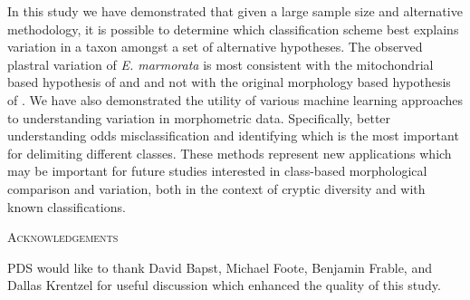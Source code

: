 \documentclass[12pt,letterpaper]{article}\usepackage{graphicx, color}
\renewcommand{\section}[1]{%
\bigskip
\begin{center}
\begin{Large}
\normalfont\scshape #1
\medskip
\end{Large}
\end{center}}
\begin{document}

In this study we have demonstrated that given a large sample size and alternative methodology, it is possible to determine which classification scheme best explains variation in a taxon amongst a set of alternative hypotheses. The observed plastral variation of \textit{E. marmorata} is most consistent with the mitochondrial based hypothesis of \citet{Spinks2005} and \citet{Spinks2010} and not with the original morphology based hypothesis of \citet{Seeliger1945}. We have also demonstrated the utility of various machine learning approaches to understanding variation in morphometric data. Specifically, better understanding odds misclassification and identifying which is the most important for delimiting different classes. These methods represent new applications which may be important for future studies interested in class-based morphological comparison and variation, both in the context of cryptic diversity and with known classifications.

\section{Acknowledgements}
PDS would like to thank David Bapst, Michael Foote, Benjamin Frable, and Dallas Krentzel for useful discussion which enhanced the quality of this study.



\end{document}
